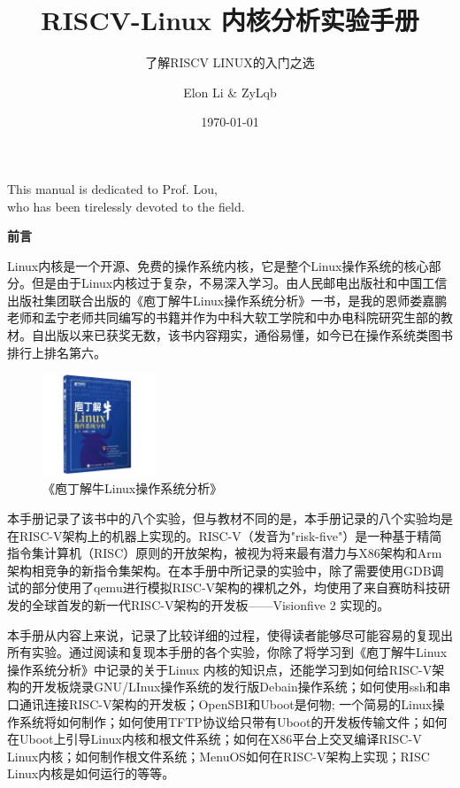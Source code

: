 \documentclass[lang=cn,10pt]{elegantbook}
\title{RISCV-Linux 内核分析实验手册}
\subtitle{了解RISCV LINUX的入门之选}
\author{Elon Li \& ZyLqb}
\institute{Beijing Electronic Science and Technology Institute}
\date{\today}
\begin{document}
\maketitle
\frontmatter

\newpage

\vspace*{\fill}
\begin{center}
{\Large\calligra This manual is dedicated to Prof. Lou, \\who has been tirelessly devoted to the field.}
\end{center}
\vspace*{\fill}

\newpage
\thispagestyle{empty} 
\begin{center}
  \textbf{\large 前言}
\end{center}

Linux内核是一个开源、免费的操作系统内核，它是整个Linux操作系统的核心部分。但是由于Linux内核过于复杂，不易深入学习。由人民邮电出版社和中国工信出版社集团联合出版的《庖丁解牛Linux操作系统分析》一书，是我的恩师娄嘉鹏老师和孟宁老师共同编写的书籍并作为中科大软工学院和中办电科院研究生部的教材。自出版以来已获奖无数，该书内容翔实，通俗易懂，如今已在操作系统类图书排行上排名第六。

\begin{figure}[htbp]
  \centering
  \includegraphics[width=0.3\textwidth]{image/linuxbook.jpg}
  \caption{《庖丁解牛Linux操作系统分析》}
\end{figure}

本手册记录了该书中的八个实验，但与教材不同的是，本手册记录的八个实验均是在RISC-V架构上的机器上实现的。RISC-V（发音为"risk-five"）是一种基于精简指令集计算机（RISC）原则的开放架构，被视为将来最有潜力与X86架构和Arm架构相竞争的新指令集架构。在本手册中所记录的实验中，除了需要使用GDB调试的部分使用了qemu进行模拟RISC-V架构的裸机之外，均使用了来自赛昉科技研发的全球首发的新一代RISC-V架构的开发板——Visionfive 2 实现的。

本手册从内容上来说，记录了比较详细的过程，使得读者能够尽可能容易的复现出所有实验。通过阅读和复现本手册的各个实验，你除了将学习到《庖丁解牛Linux操作系统分析》中记录的关于Linux 内核的知识点，还能学习到如何给RISC-V架构的开发板烧录GNU/LInux操作系统的发行版Debain操作系统；如何使用ssh和串口通讯连接RISC-V架构的开发板；OpenSBI和Uboot是何物; 一个简易的Linux操作系统将如何制作；如何使用TFTP协议给只带有Uboot的开发板传输文件；如何在Uboot上引导Linux内核和根文件系统；如何在X86平台上交叉编译RISC-V Linux内核；如何制作根文件系统；MenuOS如何在RISC-V架构上实现；RISC Linux内核是如何运行的等等。
\end{document}
